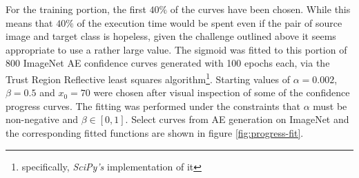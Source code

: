 \documentclass[11pt, a4paper]{article}
\newcommand\brackets[1]{\left[#1\right]}
\begin{document}
For the training portion, the first $40\%$ of the curves have been chosen. While this means that $40\%$ of the execution time would be spent even if the pair of source image and target class is hopeless, given the challenge outlined above it seems appropriate to use a rather large value. The sigmoid was fitted to this portion of 800 ImageNet AE confidence curves generated with 100 epochs each, via the Trust Region Reflective least squares algorithm\footnote{specifically, \emph{SciPy's} implementation of it}. Starting values of $\alpha = 0.002$, $\beta = 0.5$ and $x_0 = 70$ were chosen after visual inspection of some of the confidence progress curves. The fitting was performed under the constraints that $\alpha$ must be non-negative and $\beta \in \brackets{0, 1}$. Select curves from AE generation on ImageNet and the corresponding fitted functions are shown in figure \ref{fig:progress-fit}.
\end{document}
